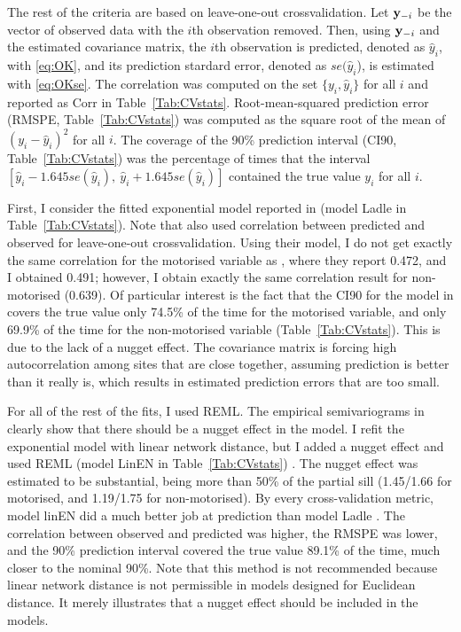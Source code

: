 \documentclass[11pt, titlepage]{article}\usepackage[]{graphicx}\usepackage[]{color}
\begin{document}
\begin{spacing}{1.9}
\begin{flushleft}
The rest of the criteria are based on leave-one-out crossvalidation.  Let $\mathbf{y}_{-i}$ be the vector of observed data with the $i$th observation removed. Then, using $\mathbf{y}_{-i}$ and the estimated covariance matrix, the $i$th observation is predicted, denoted as $\hat{y}_i$,  with \ref{eq:OK}, and its prediction stardard error, denoted as $se(\hat{y}_i$), is estimated with \ref{eq:OKse}. The correlation was computed on the set $\{y_i,\hat{y}_i\}$ for all $i$ and reported as Corr in Table~\ref{Tab:CVstats}.  Root-mean-squared prediction error (RMSPE, Table~\ref{Tab:CVstats}) was computed as the square root of the mean of $(y_i-\hat{y}_i)^2$ for all $i$. The coverage of the 90\% prediction interval (CI90, Table~\ref{Tab:CVstats}) was the percentage of times that the interval $[\hat{y}_i - 1.645 se(\hat{y}_i), \ \hat{y}_i + 1.645 se(\hat{y}_i)]$ contained the true value $y_i$ for all $i$.

First, I consider the fitted exponential model reported in \citet{Ladl:Avga:Whea:Boyc:pred:2016} (model Ladle in Table~\ref{Tab:CVstats}). Note that \citet{Ladl:Avga:Whea:Boyc:pred:2016} also used correlation between predicted and observed for leave-one-out crossvalidation. Using their model, I do not get exactly the same correlation for the motorised variable as \citet{Ladl:Avga:Whea:Boyc:pred:2016}, where they report 0.472, and I obtained 0.491; however, I obtain exactly the same correlation result for non-motorised (0.639).  Of particular interest is the fact that the CI90 for the model in \citet{Ladl:Avga:Whea:Boyc:pred:2016} covers the true value only 74.5\% of the time for the motorised variable, and only 69.9\% of the time for the non-motorised variable (Table~\ref{Tab:CVstats}). This is due to the lack of a nugget effect. The covariance matrix is forcing high autocorrelation among sites that are close together, assuming prediction is better than it really is, which results in estimated prediction errors that are too small. 

 For all of the rest of the fits, I used REML. The empirical semivariograms in \citet{Ladl:Avga:Whea:Boyc:pred:2016} clearly show that there should be a nugget effect in the model. I refit the exponential model with linear network distance, but I added a nugget effect and used REML (model LinEN in Table~\ref{Tab:CVstats}) .  The nugget effect was estimated to be substantial, being more than 50\% of the partial sill (1.45/1.66 for motorised, and 1.19/1.75 for non-motorised). By every cross-validation metric, model linEN did a much better job at prediction than model Ladle  \citep{Ladl:Avga:Whea:Boyc:pred:2016}.  The correlation between observed and predicted was higher, the RMSPE was lower, and the 90\% prediction interval covered the true value 89.1\% of the time, much closer to the nominal 90\%. Note that this method is not recommended because linear network distance is not permissible in models designed for Euclidean distance. It merely illustrates that a nugget effect should be included in the models.


\end{flushleft}
\end{spacing}
\end{document}
